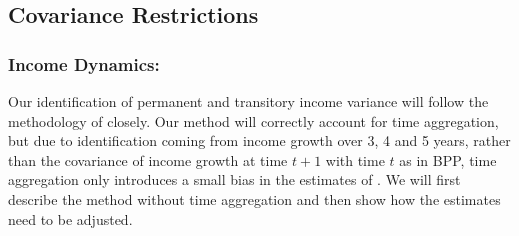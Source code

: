 \documentclass[titlepage]{\econtex}\newcommand{\texname}{ConsumptionHeterogeneity}
\begin{document}
\subsection{Covariance Restrictions} \label{cov_restrictions}

\subsubsection{Income Dynamics: \cite{carroll_nature_1997}}
Our identification of permanent and transitory income variance will follow the methodology of \cite{carroll_nature_1997} closely. Our method will correctly account for time aggregation, but due to identification coming from income growth over 3, 4 and 5 years, rather than the covariance of income growth at time $t+1$ with time $t$ as in BPP, time aggregation only introduces a small bias in the estimates of \cite{carroll_nature_1997}. We will first describe the method without time aggregation and then show how the estimates need to be adjusted.
\end{document}
